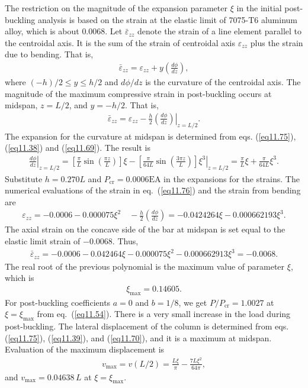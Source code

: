 \documentclass{AeroStructure-ERJohnson}
\begin{document}
\begin{example}
The restriction on the magnitude of the expansion parameter $\xi$ in the initial post-buckling analysis is based on the strain at the elastic limit of 7075-T6 aluminum alloy, which is about $0.0068$. Let $\bar{\varepsilon}_{z z}$ denote the strain of a line element parallel to the centroidal axis. It is the sum of the strain of centroidal axis $\varepsilon_{z z}$ plus the strain due to bending. That is,
\begin{align}
\bar{\varepsilon}_{z z}=\varepsilon_{z z}+y\left(\frac{d \phi}{d z}\right), \label{eq11.2.b}\tag{b}
\end{align}
where $(-h)/2 \leq y \leq h/2$ and $d \phi/d z$ is the curvature of the centroidal axis. The magnitude of the maximum compressive strain in post-buckling occurs at midspan, $z=L/2$, and $y=-h/2$. That is,
\begin{align}
\bar{\varepsilon}_{z z}=\varepsilon_{z z}-\left.\frac{h}{2}\left(\frac{d \phi}{d z}\right)\right|_{z=L/2}. \label{eq11.2.c}\tag{c}
\end{align}
The expansion for the curvature at midspan is determined from eqs. (\ref{eq11.75}), (\ref{eq11.38}) and (\ref{eq11.69}). The result is
\begin{align}
\left.\frac{d \phi}{d z}\right|_{z=L/2}=\left[\frac{\pi}{L} \sin \left(\frac{\pi z}{L}\right)\right] \xi-\left.\left[\frac{\pi}{64 L} \sin \left(\frac{3 \pi z}{L}\right)\right] \xi^{3}\right|_{z=L/2}=\frac{\pi}{L} \xi+\frac{\pi}{64 L} \xi^{3}. \label{eq11.2.d}\tag{d}
\end{align}
Substitute $h=0.270L$ and $P_{\mathrm{cr}}=0.0006 \mathrm{EA}$ in the expansions for the strains. The numerical evaluations of the strain in eq.~(\ref{eq11.76}) and the strain from bending are
\begin{align}
\varepsilon_{z z}=-0.0006-0.000075 \xi^{2} \quad-\frac{h}{2}\left(\frac{d \phi}{d z}\right)=-0.0424264 \xi-0.000662193 \xi^{3}. \label{eq11.2.e}\tag{e}
\end{align}
The axial strain on the concave side of the bar at midspan is set equal to the elastic limit strain of $-0.0068$. Thus,
\begin{align*}
\bar{\varepsilon}_{z z}=-0.0006-0.042464 \xi-0.000075 \xi^{2}-0.000662913 \xi^{3}=-0.0068.
\end{align*}
The real root of the previous polynomial is the maximum value of parameter $\xi$, which is
\begin{align}
\xi_{\max }=0.14605. \label{eq11.2.f}\tag{f}
\end{align}
For post-buckling coefficients $a=0$ and $b=1/8$, we get $P/P_{\mathrm{cr}}=1.0027$ at $\xi=\xi_{\max}$ from eq.~(\ref{eq11.54}). There is a very small increase in the load during post-buckling. The lateral displacement of the column is determined from eqs. (\ref{eq11.75}), (\ref{eq11.39}), and (\ref{eq11.70}), and it is a maximum at midspan. Evaluation of the maximum displacement is
\begin{align}
v_{\max }=v(L/2)=\frac{L \xi}{\pi}-\frac{7 L \xi^{2}}{64 \pi}, \label{eq11.2.g}\tag{g}
\end{align}
and $v_{\max }=0.04638\,{L}$ at $\xi=\xi_{\max }$.


\end{example}
\end{document}
